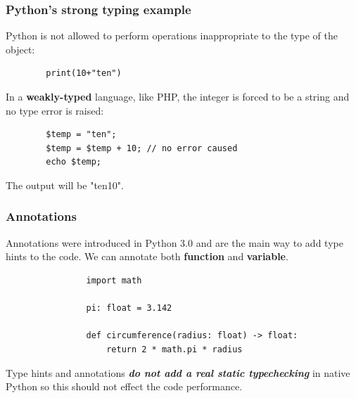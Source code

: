 \documentclass[xcolor ={table,usenames,dvipsnames}]{beamer}
\theoremstyle{definition}
\begin{document}
	\begin{frame}[fragile]
		\frametitle{Python's strong typing example}
		Python is not allowed to perform operations inappropriate to the type of the object: 
		\begin{lstlisting}
		print(10+"ten")
		\end{lstlisting}
		
		In a \textbf{weakly-typed} language, like PHP, the integer is forced to be a string and no type error is raised:
		\begin{lstlisting}
		$temp = "ten"; 
		$temp = $temp + 10; // no error caused
		echo $temp;
		\end{lstlisting}
	The output will be "ten10".
	\end{frame}

%		

%		
%		
		
%		

	\begin{frame}[fragile]
		\frametitle{Annotations}
			Annotations were introduced in Python 3.0 and are the main way to add type hints to the code. We can annotate both \textbf{function} and \textbf{variable}.
			
			\begin{lstlisting}
				import math
				
				pi: float = 3.142
				
				def circumference(radius: float) -> float:
					return 2 * math.pi * radius
			\end{lstlisting}
			
			Type hints and annotations \textbf{\textit{do not add a real static typechecking}} in native Python so this should not effect the code performance.\\
	\end{frame}
\end{document}
